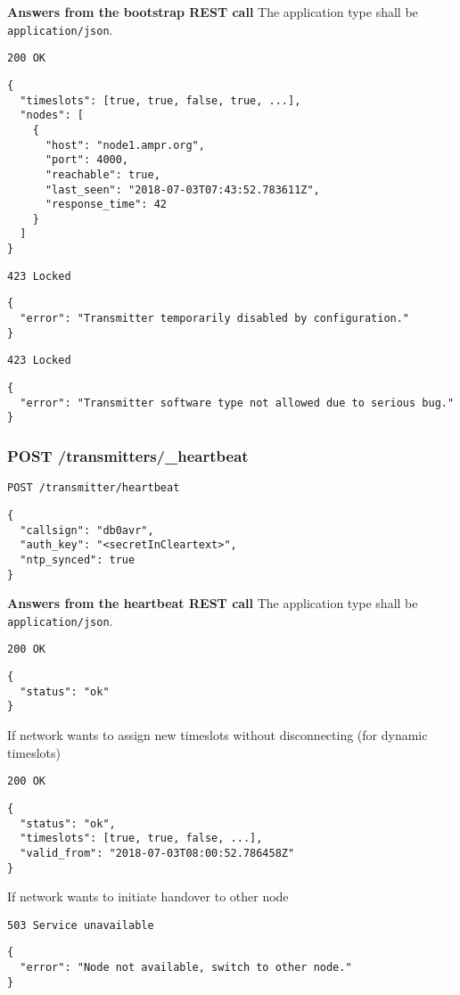 \textbf{Answers from the bootstrap REST call}
The application type shall be \verb|application/json|.


\texttt{200 OK}
\begin{lstlisting}
{
  "timeslots": [true, true, false, true, ...],
  "nodes": [
    {
      "host": "node1.ampr.org",
      "port": 4000,
      "reachable": true,
      "last_seen": "2018-07-03T07:43:52.783611Z",
      "response_time": 42
    }
  ]
}
\end{lstlisting}

\texttt{423 Locked}
\begin{lstlisting}
{
  "error": "Transmitter temporarily disabled by configuration."
}
\end{lstlisting}

\texttt{423 Locked}
\begin{lstlisting}
{
  "error": "Transmitter software type not allowed due to serious bug."
}
\end{lstlisting}


\subsubsection{POST /transmitters/\_heartbeat}
\texttt{POST /transmitter/heartbeat}
\begin{lstlisting}
{
  "callsign": "db0avr",
  "auth_key": "<secretInCleartext>",
  "ntp_synced": true
}
\end{lstlisting}

\textbf{Answers from the heartbeat REST call}
The application type shall be \verb|application/json|.

\texttt{200 OK}
\begin{lstlisting}
{
  "status": "ok"
}
\end{lstlisting}

If network wants to assign new timeslots without disconnecting (for dynamic timeslots)

\texttt{200 OK}
\begin{lstlisting}
{
  "status": "ok",
  "timeslots": [true, true, false, ...],
  "valid_from": "2018-07-03T08:00:52.786458Z"
}
\end{lstlisting}

If network wants to initiate handover to other node

\texttt{503 Service unavailable}
\begin{lstlisting}
{
  "error": "Node not available, switch to other node."
}
\end{lstlisting}


